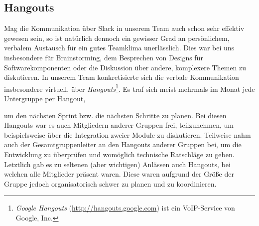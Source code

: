 
\subsection{Hangouts}
\label{team:group-slack}

Mag die Kommunikation über Slack in unserem Team auch schon sehr effektiv
gewesen sein, so ist natürlich dennoch ein gewisser Grad an persönlichem,
verbalem Austausch für ein gutes Teamklima unerlässlich. Dies war bei uns
insbesondere für Brainstorming, dem Besprechen von Designs für
Softwarekomponenten oder die Diskussion über andere, komplexere Themen zu
diskutieren. In unserem Team konkretisierte sich die verbale Kommunikation
insbesondere virtuell, über \emph{Hangouts}\footnote{\emph{Google Hangouts}
(\url{http://hangouts.google.com}) ist ein VoIP-Service von Google, Inc.}. Es
traf sich meist mehrmals im Monat jede Untergruppe per Hangout,

\vspace{0.2cm}
\pagebreak

um den nächsten Sprint bzw. die nächsten Schritte zu planen. Bei diesen Hangouts
war es auch Mitgliedern anderer Gruppen frei, teilzunehmen, um beispielsweise
über die Integration zweier Module zu diskutieren. Teilweise nahm auch der
Gesamtgruppenleiter an den Hangouts anderer Gruppen bei, um die Entwicklung zu
überprüfen und womöglich technische Ratschläge zu geben. Letztlich gab es zu
seltenen (aber wichtigen) Anlässen auch Hangouts, bei welchen alle Mitglieder
präsent waren. Diese waren aufgrund der Größe der Gruppe jedoch organisatorisch
schwer zu planen und zu koordinieren.
